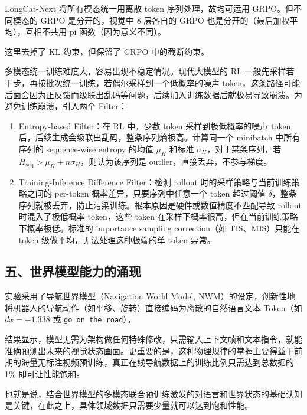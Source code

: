 LongCat-Next 将所有模态统一用离散 token 序列处理，故均可运用 GRPO。但不同模态的 GRPO 是分开的，视觉中 8 层各自的 GRPO 也是分开的（最后加权平均），互相不共用 pi 函数（因为意义不同）。

这里去掉了 KL 约束，但保留了 GRPO 中的截断约束。

多模态统一训练难度大，容易出现不稳定情况。现代大模型的 RL 一般先采样若干步，再按批次统一训练，若偶尔采样到一个低概率的噪声 token，这条路径可能后面会因为正反馈而级联出乱码等问题，后续加入训练数据后就极易导致崩溃。为避免训练崩溃，引入两个 Filter：

\begin{enumerate}
\def\labelenumi{\arabic{enumi}.}
\tightlist
\item
  Entropy-based Filter：在 RL 中，少数 token 采样到极低概率的噪声 token 后，后续生成会级联出乱码，整条序列熵极高。计算同一个 minibatch 中所有序列的 sequence-wise entropy 的均值 \(\mu_H\) 和标准 \(\sigma_H\)，对于某条序列，若 \(H_{\mathrm{seq}}>\mu_H+n\sigma_H\)，则认为该序列是 outlier，直接丢弃，不参与梯度。
\item
  Training-Inference Difference Filter：检测 rollout 时的采样策略与当前训练策略之间的 per-token 概率差异，只要序列中任意一个 token 超过阈值 \(\delta\)，整条序列就被丢弃，防止污染训练。根本原因是硬件或数值精度不匹配导致 rollout 时混入了极低概率 token，这些 token 在采样下概率很高，但在当前训练策略下概率极低。标准的 importance sampling correction（如 TIS、MIS）只能在 token 级做平均，无法处理这种极端的单 token 异常。
\end{enumerate}

\hypertarget{ux4e94ux4e16ux754cux6a21ux578bux80fdux529bux7684ux6d8cux73b0}{%
\subsection{五、世界模型能力的涌现}\label{ux4e94ux4e16ux754cux6a21ux578bux80fdux529bux7684ux6d8cux73b0}}

实验采用了导航世界模型（Navigation World Model, NWM）的设定，创新性地将机器人的导航动作（如平移、旋转）直接编码为离散的自然语言文本 Token（如 \(dx=+1.338\) 或 \texttt{go\ on\ the\ road}）。

结果显示，模型无需为架构做任何特殊修改，只需输入上下文帧和文本指令，就能准确预测出未来的视觉状态画面。更重要的是，这种物理规律的掌握主要得益于前期的海量无标注视频预训练，真正在线导航数据上的训练比例只需达到总数据的 1\% 即可让性能饱和。

也就是说，结合世界模型的多模态联合预训练激发的对语言和世界状态的基础认知是关键，在此之上，具体领域数据只需要少量就可以达到饱和性能。

